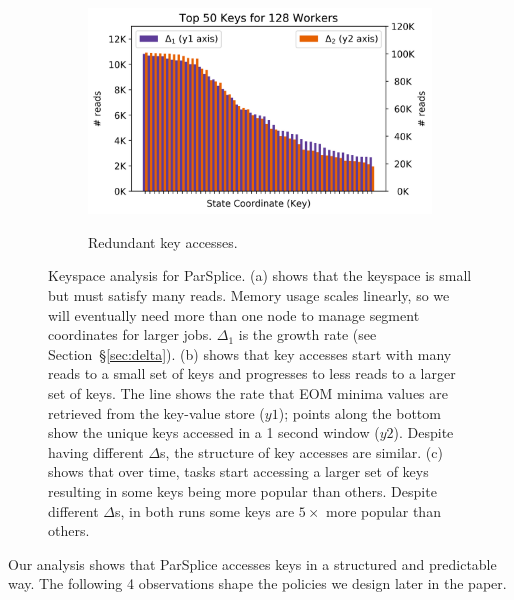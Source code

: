 \begin{figure}[t]
\begin{subfigure}[b]{.32\linewidth}
{    \label{fig:motivation-regimes}}
  \end{subfigure}
  \begin{subfigure}[b]{.32\linewidth}
    \includegraphics[width=1.05\textwidth]{figures/methodology-keys.png}\\
    \caption{Redundant key accesses.
    \label{fig:methodology-keys}}
  \end{subfigure}
  \caption{Keyspace analysis for ParSplice.
    (a) shows that the keyspace is small but must satisfy many reads. Memory
    usage scales linearly, so we will eventually need more than one node to manage
    segment coordinates for larger jobs. \(\Delta_1\) is the growth rate (see
    Section~\S\ref{sec:delta}).
    (b) shows that key accesses start with many reads to a small set of
    keys and progresses to less reads to a larger set of keys.  The line shows the
    rate that EOM minima values are retrieved from the key-value store (\(y1\));
    points along the bottom show the unique keys accessed in a 1
    second window (\(y2\)). Despite having different
    \(\Delta\)s, the structure of key accesses are similar.
    (c) shows that over time, tasks start accessing a larger set of keys resulting in
    some keys being more popular than others.  Despite different
    \(\Delta\)s, in both runs some keys are \(5\times\) more popular than others.
  }
\end{figure}

Our analysis shows that ParSplice accesses keys in a structured and predictable
way. The following 4 observations shape the policies we design later in the
paper.

